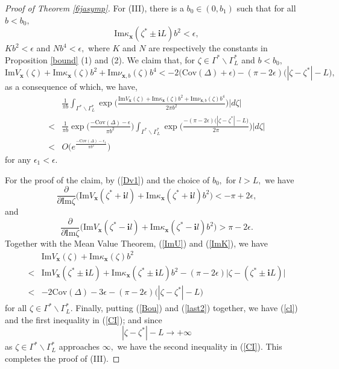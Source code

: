 \documentclass[11pt]{article}
\renewcommand{\setminus}{{\smallsetminus}}
\theoremstyle{remark}
\theoremstyle{remark}
\numberwithin{equation}{section}
\begin{document}
\begin{proof}[Proof of Theorem \ref{6jasymp}]
For (III), there  is a $b_0\in (0, b_1)$ such that for all $b<b_0,$
\begin{equation}\label{ImK}
\mathrm{Im}\kappa_{\boldsymbol x}(\zeta^*\pm \mathbf i L) b^2<\epsilon,
\end{equation}
$Kb^2<\epsilon$ and $Nb^4<\epsilon,$ where $K$ and $N$ are respectively the constants in Proposition \ref{bound} (1) and (2). We claim that, for $\zeta\in\Gamma^*\setminus \Gamma^*_L$ and $b<b_0,$ 
\begin{equation}\label{cl}
\mathrm{Im}V_{\boldsymbol  x}(\zeta)+\mathrm{Im}\kappa_{\boldsymbol  x}(\zeta)b^2+\mathrm{Im}\nu_{\boldsymbol  x,b}(\zeta)b^4<-2\big(\mathrm{Cov}(\Delta)+\epsilon\big)-(\pi-2\epsilon)\big(|\zeta-\zeta^*|-L\big),
\end{equation}
as a consequence of which, we have,
\begin{equation}\label{CI}
\begin{split}
& \frac{1}{\pi b}\int_{\Gamma^*\setminus \Gamma^*_L}\exp\bigg(\frac{\mathrm{Im}V_{\boldsymbol  x}(\zeta)+\mathrm{Im}\kappa_{\boldsymbol  x}(\zeta)b^2+\mathrm{Im}\nu_{\boldsymbol  x,b}(\zeta)b^4}{2\pi b^2} \bigg)|d\zeta| \\
 < & \frac{1}{\pi b} \exp\bigg(\frac{-\mathrm{Cov}(\Delta)-\epsilon}{\pi b^2}\bigg)\int_{\Gamma^*\setminus \Gamma^*_L}\exp\bigg(\frac{-(\pi-2\epsilon)\big(|\zeta-\zeta^*|-L\big)}{2\pi}\bigg) |d\zeta|\\
< & O\Big(e^{\frac{-\mathrm{Cov}(\Delta)-\epsilon_1}{\pi b^2}}\Big)
\end{split}
\end{equation}
for any $\epsilon_1<\epsilon.$ 

For the proof of the claim, by (\ref{Dv1}) and the choice of $b_0,$ for $l>L,$ we have 
$$\frac{\partial}{\partial \mathrm{Im}\zeta} \Big(\mathrm{Im}V_{\boldsymbol x}(\zeta^*+\mathbf il)+\mathrm{Im}\kappa_{\boldsymbol x}(\zeta^*+\mathbf il)b^2\Big)<-\pi+2\epsilon,$$
and 
$$\frac{\partial}{\partial \mathrm{Im}\zeta} \Big(\mathrm{Im}V_{\boldsymbol x}(\zeta^*-\mathbf il)+\mathrm{Im}\kappa_{\boldsymbol x}(\zeta^*-\mathbf il)b^2\Big)>\pi-2\epsilon.$$
Together with the Mean Value Theorem, (\ref{ImU}) and (\ref{ImK}), we have 
\begin{equation}\label{Bou}
\begin{split}
&\mathrm{Im}V_{\boldsymbol x}(\zeta)+ \mathrm{Im}\kappa_{\boldsymbol x}(\zeta)b^2 \\
< & \mathrm{Im}V_{\boldsymbol x}(\zeta^*\pm \mathbf iL) + \mathrm{Im}
\kappa_{\boldsymbol x}(\zeta^*\pm \mathbf iL)b^2 - (\pi-2\epsilon) \big |  \zeta - (\zeta^*\pm \mathbf iL ) \big|\\
< & -2\mathrm{Cov}(\Delta)-3\epsilon  -(\pi-2\epsilon)\big(|\zeta-\zeta^*|-L \big)
\end{split}
\end{equation}
for all $\zeta \in \Gamma^*\setminus \Gamma^*_L.$  Finally, putting (\ref{Bou}) and (\ref{last2}) together, we have  (\ref{cl}) and the first  inequality in (\ref{CI}); and since 
$$|\zeta-\zeta^*|-L\to+\infty$$
as $\zeta \in \Gamma^*\setminus \Gamma^*_L$ approaches $\infty,$ we have the second inequality in (\ref{CI}). This completes the proof of (III).
\medskip



\end{proof}
\end{document}
